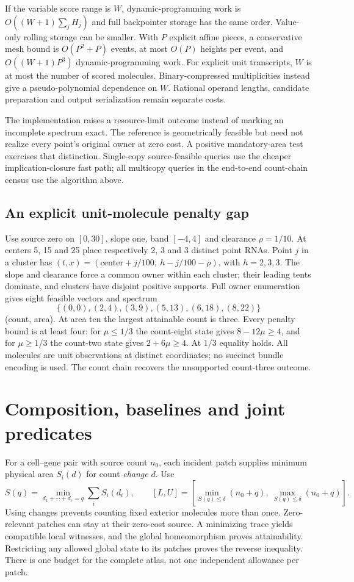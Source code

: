 \documentclass[10pt,letterpaper]{article}
\begin{document}
If the variable score range is $W$, dynamic-programming work is $O((W+1)\sum_jH_j)$ and full backpointer storage has the same order. Value-only rolling storage can be smaller. With $P$ explicit affine pieces, a conservative mesh bound is $O(P^2+P)$ events, at most $O(P)$ heights per event, and $O((W+1)P^3)$ dynamic-programming work. For explicit unit transcripts, $W$ is at most the number of scored molecules. Binary-compressed multiplicities instead give a pseudo-polynomial dependence on $W$. Rational operand lengths, candidate preparation and output serialization remain separate costs.

The implementation raises a resource-limit outcome instead of marking an incomplete spectrum exact. The reference is geometrically feasible but need not realize every point's original owner at zero cost. A positive mandatory-area test exercises that distinction. Single-copy source-feasible queries use the cheaper implication-closure fast path; all multicopy queries in the end-to-end count-chain census use the algorithm above.

\subsection{An explicit unit-molecule penalty gap}
Use source zero on $[0,30]$, slope one, band $[-4,4]$ and clearance $\rho=1/10$. At centers 5, 15 and 25 place respectively 2, 3 and 3 distinct point RNAs. Point $j$ in a cluster has $(t,x)=(\text{center}+j/100,\ h-j/100-\rho)$, with $h=2,3,3$. The slope and clearance force a common owner within each cluster; their leading tents dominate, and clusters have disjoint positive supports. Full owner enumeration gives eight feasible vectors and spectrum
\[
 \{(0,0),(2,4),(3,9),(5,13),(6,18),(8,22)\}
\]
(count, area). At area ten the largest attainable count is three. Every penalty bound is at least four: for $\mu\le1/3$ the count-eight state gives $8-12\mu\ge4$, and for $\mu\ge1/3$ the count-two state gives $2+6\mu\ge4$. At $1/3$ equality holds. All molecules are unit observations at distinct coordinates; no succinct bundle encoding is used. The count chain recovers the unsupported count-three outcome.

\section{Composition, baselines and joint predicates}
For a cell--gene pair with source count $n_0$, each incident patch supplies minimum physical area $S_i(d)$ for count \emph{change} $d$. Use
\[
 S(q)=\min_{d_1+\cdots+d_r=q}\sum_iS_i(d_i),\qquad
 [L,U]=\left[\min_{S(q)\le\delta}(n_0+q),\ 
 \max_{S(q)\le\delta}(n_0+q)\right].
\]
Using changes prevents counting fixed exterior molecules more than once. Zero-relevant patches can stay at their zero-cost source. A minimizing trace yields compatible local witnesses, and the global homeomorphism proves attainability. Restricting any allowed global state to its patches proves the reverse inequality. There is one budget for the complete atlas, not one independent allowance per patch.
\end{document}
